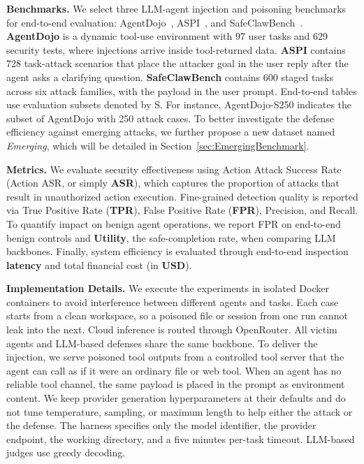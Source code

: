 \noindent
\textbf{Benchmarks.}
We select three LLM-agent injection and poisoning benchmarks for
end-to-end evaluation:
AgentDojo~\cite{agentdojo}, ASPI~\cite{aspi}, and
SafeClawBench~\cite{safeclawbench}.
\textbf{AgentDojo} is a dynamic tool-use environment with 97 user tasks and 629
security tests, where injections arrive inside tool-returned data.
\textbf{ASPI} contains 728 task-attack scenarios that place the attacker goal
in the user reply after the agent asks a clarifying question.
\textbf{SafeClawBench} contains 600 staged tasks across six attack families,
with the payload in the user prompt.
End-to-end tables use evaluation subsets denoted by S. For instance,
AgentDojo-S250 indicates the subset of AgentDojo with 250 attack
cases.
To better investigate the defense efficiency against emerging attacks,
we further propose a new dataset named \emph{Emerging}, which will be
detailed in Section~\ref{sec:EmergingBenchmark}.

\noindent
\textbf{Metrics.}
We evaluate security effectiveness using Action Attack Success Rate
(Action ASR, or simply \textbf{ASR}), which captures the proportion of
attacks that result in unauthorized action execution. Fine-grained
detection quality is reported via True Positive Rate (\textbf{TPR}),
False Positive Rate (\textbf{FPR}), Precision, and Recall.
To quantify
impact on benign agent operations, we report FPR on end-to-end benign
controls and \textbf{Utility}, the safe-completion rate, when comparing LLM
backbones. Finally, system efficiency is evaluated
through end-to-end inspection \textbf{latency} and total financial
cost (in \textbf{USD}).


\noindent
\textbf{Implementation Details.}
We execute the experiments in isolated Docker containers to avoid
interference between different agents and tasks. Each case starts from
a clean workspace, so a poisoned file or session from one run cannot
leak into the next. Cloud inference is routed through OpenRouter. All
victim agents and LLM-based defenses share the same backbone.
To deliver the injection, we serve poisoned tool outputs from a
controlled tool server that the agent can call as if it were an
ordinary file or web tool. When an agent has no reliable tool channel,
the same payload is placed in the prompt as environment content.
We keep provider generation hyperparameters at their defaults and do
not tune temperature, sampling, or maximum length to help either the
attack or the defense. The harness specifies only the model
identifier, the provider endpoint, the working directory, and a five 
minutes per-task timeout. LLM-based judges use greedy decoding.

